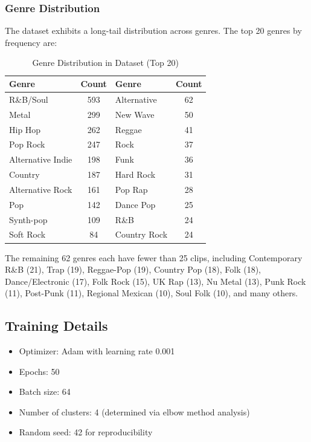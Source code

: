 \documentclass{article}
\begin{document}
\subsubsection{Genre Distribution}
The dataset exhibits a long-tail distribution across genres. The top 20 genres by frequency are:

\begin{table}[h]
\caption{Genre Distribution in Dataset (Top 20)}
\label{tab:genres}
\centering
\small
\begin{tabular}{lc|lc}
\toprule
Genre & Count & Genre & Count \\
\midrule
R\&B/Soul & 593 & Alternative & 62 \\
Metal & 299 & New Wave & 50 \\
Hip Hop & 262 & Reggae & 41 \\
Pop Rock & 247 & Rock & 37 \\
Alternative Indie & 198 & Funk & 36 \\
Country & 187 & Hard Rock & 31 \\
Alternative Rock & 161 & Pop Rap & 28 \\
Pop & 142 & Dance Pop & 25 \\
Synth-pop & 109 & R\&B & 24 \\
Soft Rock & 84 & Country Rock & 24 \\
\bottomrule
\end{tabular}
\end{table}

The remaining 62 genres each have fewer than 25 clips, including Contemporary R\&B (21), Trap (19), Reggae-Pop (19), Country Pop (18), Folk (18), Dance/Electronic (17), Folk Rock (15), UK Rap (13), Nu Metal (13), Punk Rock (11), Post-Punk (11), Regional Mexican (10), Soul Folk (10), and many others.

\subsection{Training Details}
\begin{itemize}
    \item Optimizer: Adam with learning rate 0.001
    \item Epochs: 50
    \item Batch size: 64
    \item Number of clusters: 4 (determined via elbow method analysis)
    \item Random seed: 42 for reproducibility
\end{itemize}
\end{document}
